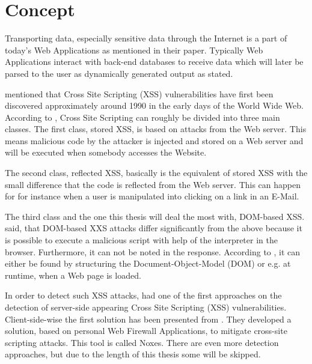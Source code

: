\section*{Concept}

Transporting data, especially sensitive data through the Internet is a part of today's Web Applications as \textcite[]{Kirda2009} mentioned in their paper. Typically Web Applications interact with back-end databases to receive data which will later be parsed to the user as dynamically generated output as \textcite[]{Su2006} stated.

\textcite[]{Hydara2015} mentioned that Cross Site Scripting (XSS) vulnerabilities have first been discovered approximately around 1990 in the early days of the World Wide Web.
According to \textcite[]{Kirda2009}, Cross Site Scripting can roughly be divided into three main classes. The first class, stored XSS, is based on attacks from the Web server. This means malicious code by the attacker is injected and stored on a Web server and will be executed when somebody accesses the Website.

The second class, reflected XSS, basically is the equivalent of stored XSS with the small difference that the code is reflected from the Web server. This can happen for for instance when a user is manipulated into clicking on a link in an E-Mail.

The third class and the one this thesis will deal the most with, DOM-based XSS. \textcite[]{Sarmah2018} said, that DOM-based XXS attacks differ significantly from the above because it is possible to execute a malicious script with help of the interpreter in the browser.
Furthermore, it can not be noted in the response. According to \textcite[]{Sarmah2018}, it can either be found by structuring the Document-Object-Model (DOM) or e.g. at runtime, when a Web page is loaded. 

In order to detect such XSS attacks,
\textcite[]{Wassermann2008} had one of the first approaches on the detection of server-side appearing Cross Site Scripting (XSS) vulnerabilities. Client-side-wise the first solution has been presented from \textcite[]{Kirda2009}. They developed a solution, based on personal Web Firewall Applications, to mitigate cross-site scripting attacks. This tool is called Noxes. There are even more detection approaches, but due to the length of this thesis some will be skipped.






